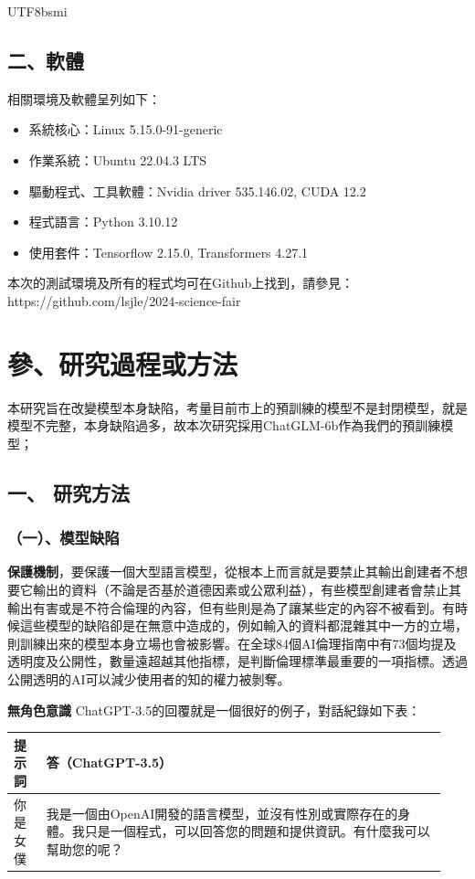 \documentclass[8pt,a4paper,新細明體,UTF8,natbib]{article}
\begin{document}
\begin{CJK*}{UTF8}{bsmi}
	\subsection{二、軟體}
	相關環境及軟體呈列如下：
	\begin{itemize}
		\item 系統核心：Linux 5.15.0-91-generic
		\item 作業系統：Ubuntu 22.04.3 LTS
		\item 驅動程式、工具軟體：Nvidia driver 535.146.02, CUDA 12.2
		\item 程式語言：Python 3.10.12
		\item 使用套件：Tensorflow 2.15.0, Transformers 4.27.1
	\end{itemize}	
	本次的測試環境及所有的程式均可在Github上找到，請參見：https://github.com/lsjle/2024-science-fair
	\section{參、研究過程或方法}
	本研究旨在改變模型本身缺陷，考量目前市上的預訓練的模型不是封閉模型，就是模型不完整，本身缺陷過多，故本次研究採用ChatGLM-6b作為我們的預訓練模型；
	\subsection{一、 研究方法}
	\subsubsection{（一）、模型缺陷}
	\textbf{保護機制}，要保護一個大型語言模型，從根本上而言就是要禁止其輸出創建者不想要它輸出的資料（不論是否基於道德因素或公眾利益），有些模型創建者會禁止其輸出有害或是不符合倫理的內容，但有些則是為了讓某些定的內容不被看到。有時候這些模型的缺陷卻是在無意中造成的，例如輸入的資料都混雜其中一方的立場，則訓練出來的模型本身立場也會被影響。在全球84個AI倫理指南中有73個均提及透明度及公開性，數量遠超越其他指標，是判斷倫理標準最重要的一項指標。透過公開透明的AI可以減少使用者的知的權力被剝奪。\cite{Jobin2019}
	
	\textbf{無角色意識}
	ChatGPT-3.5的回覆就是一個很好的例子，對話紀錄如下表：

\begin{table}[H]
	\centering
	\begin{tabular}{>{\hspace{0pt}}m{0.077\linewidth}|>{\hspace{0pt}}m{0.867\linewidth}}
		提示詞  & 答（ChatGPT-3.5）                                                       \\ 
		\hline
		你是女僕 & 我是一個由OpenAI開發的語言模型，並沒有性別或實際存在的身體。我只是一個程式，可以回答您的問題和提供資訊。有什麼我可以幫助您的呢？ 
	\end{tabular}
\end{table}

\end{CJK*}
\end{document}
